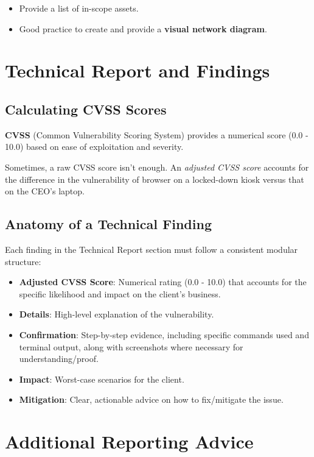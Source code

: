 \documentclass[12pt, letterpaper]{article}
\begin{document}
\begin{itemize}
    \item Provide a list of in-scope assets.
    \item Good practice to create and provide a \textbf{visual network diagram}.
\end{itemize}

\section*{Technical Report and Findings}

\subsection*{Calculating CVSS Scores}

\textbf{CVSS} (Common Vulnerability Scoring System) provides a numerical score (0.0 - 10.0) based on ease of exploitation and severity.
\medskip

Sometimes, a raw CVSS score isn't enough. An \textit{adjusted CVSS score} accounts for the difference in the vulnerability of browser on a locked-down kiosk versus that on the CEO's laptop.

\subsection*{Anatomy of a Technical Finding}

Each finding in the Technical Report section must follow a consistent modular structure:

\begin{itemize}
    \item \textbf{Adjusted CVSS Score}: Numerical rating (0.0 - 10.0) that accounts for the specific likelihood and impact on the client's business.
    \item \textbf{Details}: High-level explanation of the vulnerability.
    \item \textbf{Confirmation}: Step-by-step evidence, including specific commands used and terminal output, along with screenshots where necessary for understanding/proof.
    \item \textbf{Impact}: Worst-case scenarios for the client.
    \item \textbf{Mitigation}: Clear, actionable advice on how to fix/mitigate the issue.
\end{itemize}

\section*{Additional Reporting Advice}
\end{document}
